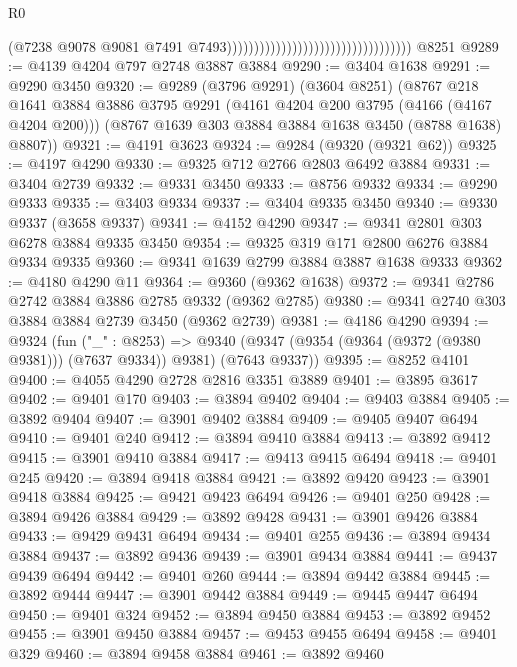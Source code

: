 \begin{lexlean}{R0}
\begin{coremodule}
                                                                      (@7238
                                                                        @9078
                                                                        @9081
                                                                        @7491
                                                                        @7493))))))))))))))))))))))))))))))))))
    @8251
@9289 := @4139 @4204 @797 @2748 @3887 @3884
@9290 := @3404 @1638
@9291 := @9290 @3450
@9320 := @9289
    (@3796 @9291)
    (@3604 @8251)
    (@8767
      @218
      @1641
      @3884
      @3886
      @3795
      @9291
      (@4161 @4204 @200 @3795 (@4166 (@4167 @4204 @200)))
      (@8767 @1639 @303 @3884 @3884 @1638 @3450 (@8788 @1638) @8807))
@9321 := @4191 @3623
@9324 := @9284 (@9320 (@9321 @62))
@9325 := @4197 @4290
@9330 := @9325 @712 @2766 @2803 @6492 @3884
@9331 := @3404 @2739
@9332 := @9331 @3450
@9333 := @8756 @9332
@9334 := @9290 @9333
@9335 := @3403 @9334
@9337 := @3404 @9335 @3450
@9340 := @9330 @9337 (@3658 @9337)
@9341 := @4152 @4290
@9347 := @9341 @2801 @303 @6278 @3884 @9335 @3450
@9354 := @9325 @319 @171 @2800 @6276 @3884 @9334 @9335
@9360 := @9341 @1639 @2799 @3884 @3887 @1638 @9333
@9362 := @4180 @4290 @11
@9364 := @9360 (@9362 @1638)
@9372 := @9341 @2786 @2742 @3884 @3886 @2785 @9332 (@9362 @2785)
@9380 := @9341 @2740 @303 @3884 @3884 @2739 @3450 (@9362 @2739)
@9381 := @4186 @4290
@9394 := @9324
    (fun ("_" : @8253) =>
    @9340 (@9347 (@9354 (@9364 (@9372 (@9380 @9381))) (@7637 @9334)) @9381) (@7643 @9337))
@9395 := @8252 @4101
@9400 := @4055 @4290 @2728 @2816 @3351 @3889
@9401 := @3895 @3617
@9402 := @9401 @170
@9403 := @3894 @9402
@9404 := @9403 @3884
@9405 := @3892 @9404
@9407 := @3901 @9402 @3884
@9409 := @9405 @9407 @6494
@9410 := @9401 @240
@9412 := @3894 @9410 @3884
@9413 := @3892 @9412
@9415 := @3901 @9410 @3884
@9417 := @9413 @9415 @6494
@9418 := @9401 @245
@9420 := @3894 @9418 @3884
@9421 := @3892 @9420
@9423 := @3901 @9418 @3884
@9425 := @9421 @9423 @6494
@9426 := @9401 @250
@9428 := @3894 @9426 @3884
@9429 := @3892 @9428
@9431 := @3901 @9426 @3884
@9433 := @9429 @9431 @6494
@9434 := @9401 @255
@9436 := @3894 @9434 @3884
@9437 := @3892 @9436
@9439 := @3901 @9434 @3884
@9441 := @9437 @9439 @6494
@9442 := @9401 @260
@9444 := @3894 @9442 @3884
@9445 := @3892 @9444
@9447 := @3901 @9442 @3884
@9449 := @9445 @9447 @6494
@9450 := @9401 @324
@9452 := @3894 @9450 @3884
@9453 := @3892 @9452
@9455 := @3901 @9450 @3884
@9457 := @9453 @9455 @6494
@9458 := @9401 @329
@9460 := @3894 @9458 @3884
@9461 := @3892 @9460

\end{coremodule}
\end{lexlean}
